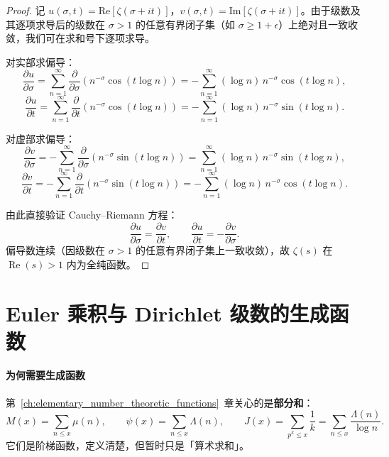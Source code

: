 \begin{proof}
记 $u(\sigma, t) = \mathrm{Re}[\zeta(\sigma + it)]$，$v(\sigma, t) = \mathrm{Im}[\zeta(\sigma + it)]$。由于级数及其逐项求导后的级数在 $\sigma > 1$ 的任意有界闭子集（如 $\sigma \geq 1+\epsilon$）上绝对且一致收敛，我们可在求和号下逐项求导。

对实部求偏导：
\[
\frac{\partial u}{\partial \sigma} =\sum_{n=1}^{\infty} \frac{\partial}{\partial \sigma} \left( n^{-\sigma} \cos(t \log n) \right) 
= -\sum_{n=1}^{\infty} (\log n) \, n^{-\sigma} \cos(t \log n),
\]
\[
\frac{\partial u}{\partial t} =\sum_{n=1}^{\infty} \frac{\partial}{\partial t} \left( n^{-\sigma} \cos(t \log n) \right) 
= -\sum_{n=1}^{\infty} (\log n) \, n^{-\sigma} \sin(t \log n).
\]

对虚部求偏导：
\[
\frac{\partial v}{\partial \sigma} = -\sum_{n=1}^{\infty} \frac{\partial}{\partial \sigma} \left( n^{-\sigma} \sin(t \log n) \right) 
=\sum_{n=1}^{\infty} (\log n) \, n^{-\sigma} \sin(t \log n),
\]
\[
\frac{\partial v}{\partial t} = -\sum_{n=1}^{\infty} \frac{\partial}{\partial t} \left( n^{-\sigma} \sin(t \log n) \right) 
= -\sum_{n=1}^{\infty} (\log n) \, n^{-\sigma} \cos(t \log n).
\]

由此直接验证 Cauchy--Riemann 方程：
\[
\frac{\partial u}{\partial \sigma} = \frac{\partial v}{\partial t}, \qquad 
\frac{\partial u}{\partial t} = -\frac{\partial v}{\partial \sigma}.
\]
偏导数连续（因级数在 $\sigma > 1$ 的任意有界闭子集上一致收敛），故 $\zeta(s)$ 在 $\operatorname{Re}(s) > 1$ 内为全纯函数。
\end{proof}


\section{Euler 乘积与 Dirichlet 级数的生成函数}
\label{subsec:arith_dirichlet_gen}
\label{subsec:chebyshev_zeta_relation}
\label{sec:euler_dirichlet_gen}

\paragraph{为何需要生成函数}
第~\ref{ch:elementary_number_theoretic_functions}~章关心的是\textbf{部分和}：
\[
  M(x)=\sum_{n\le x}\mu(n),\qquad
  \psi(x)=\sum_{n\le x}\Lambda(n),\qquad
  J(x)=\sum_{p^k\le x}\frac1k
  =\sum_{n\le x}\frac{\Lambda(n)}{\log n}.
\]
它们是阶梯函数，定义清楚，但暂时只是「算术求和」。

